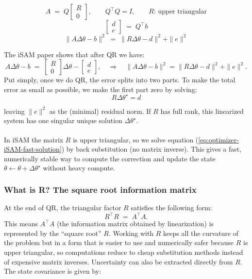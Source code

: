 $$
    A \;=\; Q
    \begin{bmatrix}
    R\\[2pt]
    0
    \end{bmatrix},
    \qquad Q^\top Q = I,
    \qquad R \text{: upper triangular}
$$
$$
    \begin{bmatrix}
    d\\ e
    \end{bmatrix}
    \;=\;
    Q^\top b
$$
$$
    \|A\Delta\theta - b\|^2
    \;=\;
    \|R\Delta\theta - d\|^2 + \|e\|^2
$$

\noindent
The iSAM paper \cite{iSAM_paper} shows that after QR we have:
$$
    A\Delta\theta - b \;=\;
    \begin{bmatrix} R \\ 0 \end{bmatrix}\Delta\theta -
    \begin{bmatrix} d \\ e \end{bmatrix},
    \quad\Rightarrow\quad
    \|A\Delta\theta - b\|^2 = \|R\Delta\theta - d\|^2 + \|e\|^2.
$$
\noindent
Put simply, once we do QR, the error splits into two parts. To make the total error as small as possible, we make the first part zero by solving:
\begin{equation}
    R\Delta\theta^\star = d
    \label{eq:optimizer-iSAM-fast-solution}
\end{equation}

\noindent
leaving $\|e\|^2$ as the (minimal) residual norm. If $R$ has full rank, this linearized system has one singular unique solution $\Delta\theta^\star$.
\\ \\
In iSAM the matrix $R$ is upper triangular, so we solve equation (\ref{eq:optimizer-iSAM-fast-solution}) by back substitution (no matrix inverse). This gives a fast, numerically stable way to compute the correction and update the state $\theta \leftarrow \theta + \Delta\theta^\star$ without heavy compute.



\subsubsection{What is R? The square root information matrix}
At the end of QR, the triangular factor $R$ satisfies the following form:
$$
R^\top R \;=\; A^\top A .
$$
This means $A^\top A$ (the information matrix obtained by linearization) is represented by the ``square root'' $R$. Working with $R$ keeps all the curvature of the problem but in a form that is easier to use and numerically safer because $R$ is upper triangular, so computations reduce to cheap substitution methods instead of expensive matrix inverses. Uncertainty can also be extracted directly from $R$. The state covariance is given by:

